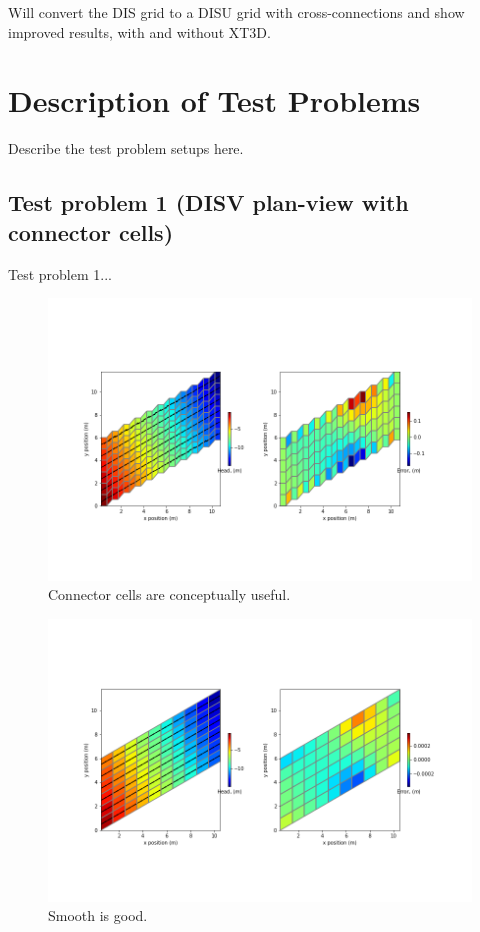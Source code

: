 \documentclass{article}
\begin{document}
Will convert the DIS grid to a DISU grid with cross-connections and show improved results, with and without XT3D.

\section{Description of Test Problems}

Describe the test problem setups here.

\subsection{Test problem 1 (DISV plan-view with connector cells)}

Test problem 1...

\begin{figure}
	\begin{center}
	\includegraphics{../figures/worm-zzag-x-i-head.png}
	\caption{Connector cells are conceptually useful.}
	\label{fig:worm-zzag-x-i-head}
	\end{center}
\end{figure}

\begin{figure}
	\begin{center}
	\includegraphics{../figures/worm-smth-x-i-head.png}
	\caption{Smooth is good.}
	\label{fig:worm-smth-x-i-head}
	\end{center}
\end{figure}
\end{document}
